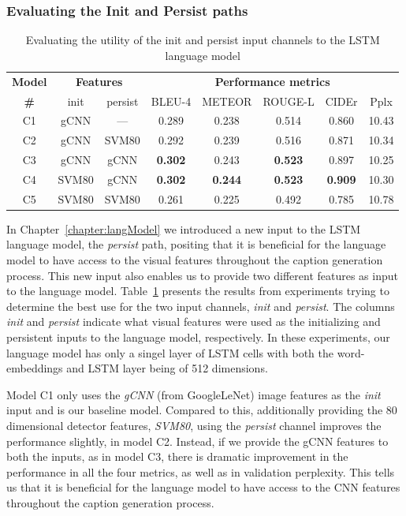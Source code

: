 \subsubsection{Evaluating the Init and Persist paths}
\label{subsubsec:InitVpersist}
\begin{table}[htp]
  \centering
  \newcommand{\bs}{\small}
  \begin{adjustbox}{center}
  \begin{tabular}{|c||c|c||c|c|c|c|c|}
    \hline
    \bf Model & \multicolumn{2}{c||}{\bf Features 
    } & \multicolumn{5}{c|}{\bf Performance metrics}\\
     \cline{2-8}
    \bf \# & init & persist &\bs BLEU-4 &\bs METEOR &\bs ROUGE-L &\bs CIDEr&\bs Pplx \\\hline
    C1 & gCNN  & ---  & 0.289 & 0.238 & 0.514 & 0.860 & 10.43  \\
    C2 & gCNN  & SVM80& 0.292 & 0.239 & 0.516 & 0.871 & 10.34  \\
    C3 & gCNN  & gCNN &\bf 0.302 & 0.243 &\bf 0.523 & 0.897 & 10.25  \\
    C4 & SVM80 & gCNN &\bf 0.302 &\bf0.244 &\bf 0.523 &\bf0.909 & 10.30  \\
    C5 & SVM80 & SVM80& 0.261 & 0.225 & 0.492 & 0.785 & 10.78 \\\hline
  \end{tabular}
  \end{adjustbox}
  \caption{ Evaluating the utility of the init and persist input channels to the
          LSTM language model}
  \label{tab:resCocInitVPers}
\end{table}

In Chapter~\ref{chapter:langModel} we introduced a new input to the LSTM language
model, the \emph{persist} path, positing that it is beneficial for the language
model to have access to the visual features throughout the caption generation
process.
This new input also enables us to provide two different features as input to the
language model.
Table~\ref{tab:resCocInitVPers} presents the results from experiments trying to
determine the best use for the two input channels, \emph{init} and
\emph{persist}.
The columns \emph{init} and \emph{persist} indicate what visual features were
used as the initializing and persistent inputs to the language model,
respectively.
In these experiments, our language model has only a singel layer of LSTM cells
with both the word-embeddings and LSTM layer being of 512 dimensions.

Model C1 only uses the \emph{gCNN} (from GoogleLeNet) image features as the
\emph{init} input and is our baseline model.
Compared to this, additionally providing the 80 dimensional detector features,
\emph{SVM80},
using the \emph{persist} channel improves the performance slightly, in model C2.
Instead, if we provide the gCNN features to both the inputs, as in model C3,
there is dramatic improvement in the performance in all the four metrics, as
well as in validation perplexity.
This tells us that it is beneficial for the language model to have access to the
CNN features throughout the caption generation process.

